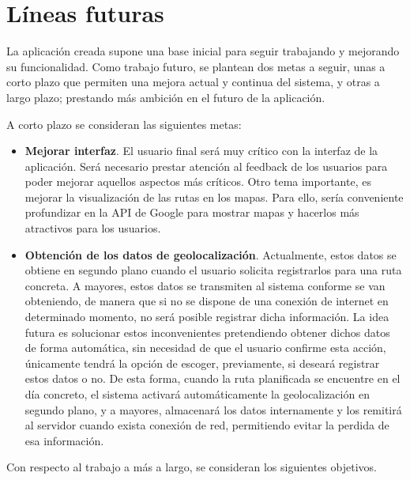 \section{Líneas futuras}
La aplicación creada supone una base inicial para seguir trabajando y mejorando su funcionalidad. Como trabajo futuro, se plantean dos metas a seguir, unas a corto plazo que permiten una mejora actual y continua del sistema, y otras a largo plazo; prestando más ambición en el futuro de la aplicación.

A corto plazo se consideran las siguientes metas:

\begin{itemize}

	\item \textbf{Mejorar interfaz}. El usuario final será muy crítico con la interfaz de la aplicación. Será necesario prestar atención al feedback de los usuarios para poder mejorar aquellos aspectos más críticos. Otro tema importante, es mejorar la visualización de las rutas en los mapas. Para ello, sería conveniente profundizar en la API de Google para mostrar mapas y hacerlos más atractivos para los usuarios.
	
	\item \textbf{Obtención de los datos de geolocalización}. Actualmente, estos datos se obtiene en segundo plano cuando el usuario solicita registrarlos para una ruta concreta. A mayores, estos datos se transmiten al sistema conforme se van obteniendo, de manera que si no se dispone de una conexión de internet en determinado momento, no será posible registrar dicha información. 
	La idea futura es solucionar estos inconvenientes pretendiendo obtener dichos datos de forma automática, sin necesidad de que el usuario confirme esta acción, únicamente tendrá la opción de escoger, previamente, si deseará registrar estos datos o no. De esta forma, cuando la ruta planificada se encuentre en el día concreto, el sistema activará automáticamente la geolocalización en segundo plano, y a mayores, almacenará los datos internamente y los remitirá al servidor cuando exista conexión de red, permitiendo evitar la perdida de esa información.

\end{itemize}

Con respecto al trabajo a más a largo, se consideran los siguientes objetivos.

